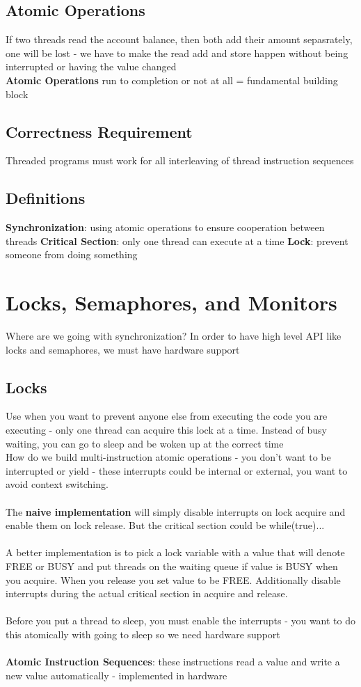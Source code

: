 \documentclass{article}
\begin{document}
\subsection{Atomic Operations}
If two threads read the account balance, then both add their amount sepasrately, one will be lost - we have to make the read add and store happen without being interrupted or having the value changed \\
\textbf{Atomic Operations} run to completion or not at all = fundamental building block
\subsection{Correctness Requirement}
Threaded programs must work for all interleaving of thread instruction sequences
\subsection{Definitions}
\textbf{Synchronization}: using atomic operations to ensure cooperation between threads
\textbf{Critical Section}: only one thread can execute at a time
\textbf{Lock}: prevent someone from doing something
\section{Locks, Semaphores, and Monitors}
Where are we going with synchronization? In order to have high level API like locks and semaphores, we must have hardware support
\subsection{Locks}
Use when you want to prevent anyone else from executing the code you are executing - only one thread can acquire this lock at a time. Instead of busy waiting, you can go to sleep and be woken up at the correct time \\
How do we build multi-instruction atomic operations - you don't want to be interrupted or yield - these interrupts could be internal or external, you want to avoid context switching. \\ \\
The \textbf{naive implementation} will simply disable interrupts on lock acquire and enable them on lock release. But the critical section could be while(true)... \\ \\
A better implementation is to pick a lock variable with a value that will denote FREE or BUSY and put threads on the waiting queue if value is BUSY when you acquire. When you release you set value to be FREE. Additionally disable interrupts during the actual critical section in acquire and release. \\ \\
Before you put a thread to sleep, you must enable the interrupts - you want to do this atomically with going to sleep so we need hardware support  \\ \\
\textbf{Atomic Instruction Sequences}: these instructions read a value and write a new value automatically - implemented in hardware
\end{document}
